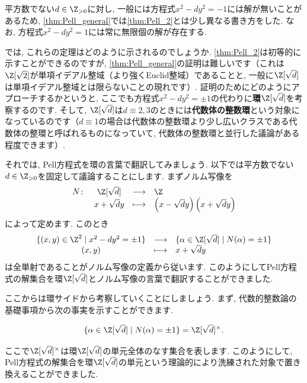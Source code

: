\documentclass[11pt,b5paper,oneside,titlepage,lualatex]{ltjsreport}
\numberwithin{equation}{section} %
\begin{document}
\begin{rem}{}{}
	平方数でない$ d \in \Z_{>0} $に対し, 一般には方程式$ x^2 - dy^2 = -1 $には解が無いことがあるため, \cref{thm:Pell_general}では\cref{thm:Pell_2}とは少し異なる書き方をした. 
	なお, 方程式$ x^2 - dy^2 = 1 $には常に無限個の解が存在する. 
\end{rem}

では, これらの定理はどのように示されるのでしょうか. 
\cref{thm:Pell_2}は初等的に示すことができるのですが, \cref{thm:Pell_general}の証明は難しいです（これは$ \Z[\sqrt{2}] $が単項イデアル整域（より強くEuclid整域）であることと, 一般に$ \Z[\sqrt{d}] $は単項イデアル整域とは限らないことの現れです）. 
証明のためにどのようにアプローチするかというと, ここでも方程式$ x^2 - dy^2 = \pm 1 $の代わりに\textbf{環}$ \Z[\sqrt{d}] $を考察するのです. 
そして, $ \Z[\sqrt{d}] $は$ d \equiv 2, 3 $のときには\textbf{代数体の整数環}という対象になっているのです（$ d \equiv 1 $の場合は代数体の整数環より少し広いクラスである代数体の整環と呼ばれるものになっていて, 代数体の整数環と並行した議論がある程度できます）. 

それでは, Pell方程式を環の言葉で翻訳してみましょう. 
以下では平方数でない$ d \in \Z_{>0} $を固定して議論することにします. 
まずノルム写像を
\[
\begin{array}{cccl}
	N \colon & \Z[\sqrt{d}] & \longrightarrow & \Z \\
	& x + \sqrt{d}y & \longmapsto & \left(x - \sqrt{d}y \right) \left(x + \sqrt{d}y \right)
\end{array}
\]
によって定めます. 
このとき
\[
\begin{array}{ccl}
	\{ (x, y) \in \Z^2 \mid x^2 - dy^2 = \pm 1 \} & \longrightarrow & \{ \alpha \in \Z[\sqrt{d}] \mid N(\alpha) = \pm 1 \} \\
	(x, y) & \longmapsto & x + \sqrt{d}y
\end{array}
\]
は全単射であることがノルム写像の定義から従います. 
このようにしてPell方程式の解集合を環$ \Z[\sqrt{d}] $とノルム写像の言葉で翻訳することができました. 

ここからは環サイドから考察していくことにしましょう. 
まず, 代数的整数論の基礎事項から次の事実を示すことができます. 

\begin{lem}{}{}
	\[
	\{ \alpha \in \Z[\sqrt{d}] \mid N(\alpha) = \pm 1 \}
	= \Z[\sqrt{d}]^\times.
	\]
\end{lem}

ここで$ \Z[\sqrt{d}]^\times $は環$ \Z[\sqrt{d}] $の単元全体のなす集合を表します. 
このようにして, Pell方程式の解集合を環$ \Z[\sqrt{d}] $の単元という理論的により洗練された対象で置き換えることができました. 
\end{document}
